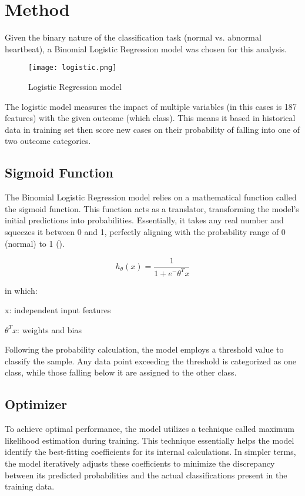 \documentclass{article}
\begin{document}
\section{Method}

\noindent Given the binary nature of the classification task (normal vs. abnormal heartbeat), a Binomial Logistic Regression model was chosen for this analysis. \\

\begin{figure}
    \centering
    \texttt{[image: logistic.png]}
    \caption{Logistic Regression model}
    \label{fig:enter-label}
\end{figure}

\noindent The logistic model measures the impact of multiple variables (in this cases is 187 features) with the given outcome (which class). This means it based in historical data in training set then score new cases on their probability of falling into one of two outcome categories. \\

\subsection{Sigmoid Function} 
The Binomial Logistic Regression model relies on a mathematical function called the sigmoid function. This function acts as a translator, transforming the model's initial predictions into probabilities. Essentially, it takes any real number and squeezes it between 0 and 1, perfectly aligning with the probability range of 0 (normal) to 1 ().

\begin{equation}h_ \theta (x) =  \frac{\mathrm{1} }{\mathrm{1} + e^- \theta^Tx }  \end{equation} 

in which: 

x: independent input features

$\theta^Tx$: weights and bias 

Following the probability calculation, the model employs a threshold value to classify the sample. Any data point exceeding the threshold is categorized as one class, while those falling below it are assigned to the other class.

\subsection{Optimizer} 
To achieve optimal performance, the model utilizes a technique called maximum likelihood estimation during training. This technique essentially helps the model identify the best-fitting coefficients for its internal calculations.  In simpler terms, the model iteratively adjusts these coefficients to minimize the discrepancy between its predicted probabilities  and the actual classifications present in the training data.
\end{document}
